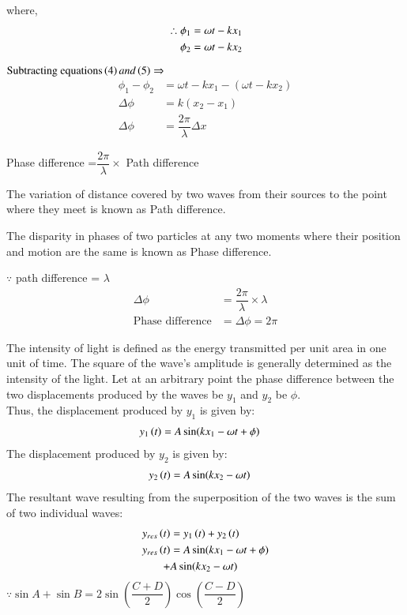 \documentclass[journal,12pt,twocolumn]{IEEEtran}
\theoremstyle{remark}
\begin{document}
where,
\begin{align}
 \therefore \phi_1 &= \omega t - kx_1 \\
\hspace*{0.4cm} \phi_2 &= \omega t - kx_2 
\end{align}

$ \text{Subtracting equations}\left(4\right) and \left(5\right)  \Rightarrow{}$
\begin{align}
   \phi_1 - \phi_2 &= \omega t - kx_1 -( \omega t - kx_2 ) \nonumber \\ 
   \Delta \phi &= k(x_2 - x_1) \nonumber \\ 
    \Delta \phi &= \dfrac{2\pi}{\lambda}\Delta x 
\end{align}

\hspace{0.3cm} Phase difference =$\dfrac{2\pi}{\lambda} \times$ Path difference

\vspace{0.2cm}

The variation of distance covered by two waves from their sources to the point where they meet is known as Path difference.

The disparity in phases of two particles at any two moments where their position and motion are the same is known as Phase difference.

$\because$ path difference = $\lambda$
\begin{align}
\Delta \phi &= \dfrac{2\pi}{\lambda}  \times \lambda \nonumber \\
\text{Phase difference} &= \Delta \phi = 2\pi
\end{align}

The intensity of light is defined as the energy transmitted per unit area in one unit of time. The square of the wave's amplitude is generally determined as the intensity of the light. 
Let at an arbitrary point the phase difference between the two displacements produced by the waves be $y_1$ and $y_2$ be $\phi$.\\
Thus, the displacement produced by $y_1$ is given by:
\begin{align}
    y_1\left(t\right) &= A\sin(kx_1 - \omega t + \phi)
\end{align}
The displacement produced by $y_2$ is given by:
\begin{align}
    y_2\left(t\right) &= A\sin(kx_2 - \omega t )
\end{align}
The resultant wave resulting from the superposition of the two waves is the sum of two individual waves:
\begin{align}
y_{res}\left(t\right) &= y_1\left(t\right) + y_2\left(t\right)  \\
y_{res}\left(t\right) &= A\sin({kx_1 - \omega t + \phi}) \nonumber \\ 
+ &A\sin({kx_2 - \omega t}) \nonumber 
\end{align}
 $ \because \sin{A} + \sin{B} = 2\sin\left(\dfrac{C+D}{2}\right) \cos\left(\dfrac{C-D}{2}\right) $ 
 
\end{document}
